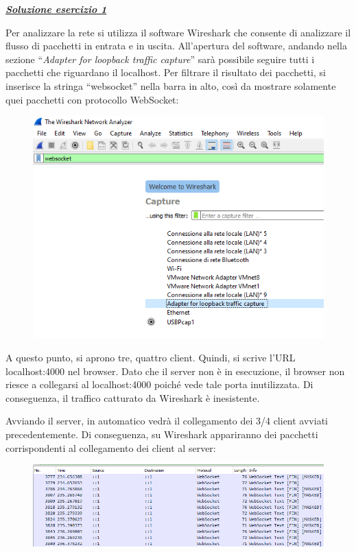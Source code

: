 \documentclass[a4paper]{article}
\newcommand{\dquotes}[1]{``#1''}
\begin{document}
	\noindent	
	\textcolor{Green4}{\textbf{\emph{\underline{Soluzione esercizio 1}}}}\newline
	
	\noindent
	Per analizzare la rete si utilizza il software Wireshark che consente di analizzare il flusso di pacchetti in entrata e in uscita. All'apertura del software, andando nella sezione \dquotes{\emph{Adapter for loopback traffic capture}} sarà possibile seguire tutti i pacchetti che riguardano il localhost. Per filtrare il risultato dei pacchetti, si inserisce la stringa \dquotes{websocket} nella barra in alto, così da mostrare solamente quei pacchetti con protocollo WebSocket:
	\begin{figure}[!htp]
		\centering
		\includegraphics[width=\textwidth]{img/soluzioni_websocket-chat/wireshark-1.png}
	\end{figure}

	\noindent
	A questo punto, si aprono tre, quattro client. Quindi, si scrive l'URL localhost:4000 nel browser. Dato che il server non è in esecuzione, il browser non riesce a collegarsi al localhost:4000 poiché vede tale porta inutilizzata. Di conseguenza, il traffico catturato da Wireshark è inesistente.\newline

	\noindent
	Avviando il server, in automatico vedrà il collegamento dei 3/4 client avviati precedentemente. Di conseguenza, su Wireshark appariranno dei pacchetti corrispondenti al collegamento dei client al server:
	\begin{figure}[!htp]
		\centering
		\includegraphics[width=\textwidth]{img/soluzioni_websocket-chat/wireshark-2.png}
	\end{figure}
\end{document}
